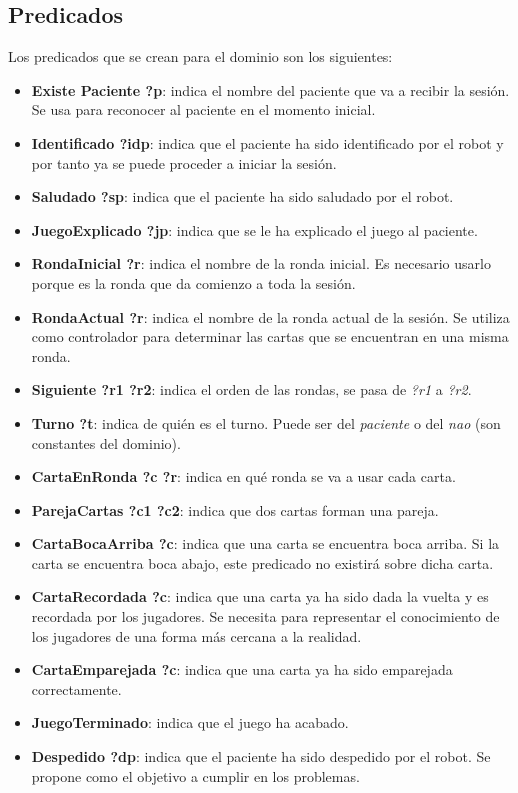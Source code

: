 \documentclass{uc3mpracticas}
\begin{document}
  \subsection{Predicados}

  Los predicados que se crean para el dominio son los siguientes:

  \begin{itemize}
    \item \textbf{Existe Paciente ?p}: indica el nombre del paciente que va a recibir la sesión. Se usa para reconocer al paciente en el momento inicial.
    \item \textbf{Identificado ?idp}: indica que el paciente ha sido identificado por el robot y por tanto ya se puede proceder a iniciar la sesión.
    \item \textbf{Saludado ?sp}: indica que el paciente ha sido saludado por el robot.
    \item \textbf{JuegoExplicado ?jp}: indica que se le ha explicado el juego al paciente.
    \item \textbf{RondaInicial ?r}: indica el nombre de la ronda inicial. Es necesario usarlo porque es la ronda que da comienzo a toda la sesión.
    \item \textbf{RondaActual ?r}: indica el nombre de la ronda actual de la sesión. Se utiliza como controlador para determinar las cartas que se encuentran en una misma ronda.
    \item \textbf{Siguiente ?r1 ?r2}: indica el orden de las rondas, se pasa de \textit{?r1} a \textit{?r2}.
    \item \textbf{Turno ?t}: indica de quién es el turno. Puede ser del \textit{paciente} o del \textit{nao} (son constantes del dominio).
    \item \textbf{CartaEnRonda ?c ?r}: indica en qué ronda se va a usar cada carta.
    \item \textbf{ParejaCartas ?c1 ?c2}: indica que dos cartas forman una pareja.
    \item \textbf{CartaBocaArriba ?c}: indica que una  carta se encuentra boca arriba. Si la carta se encuentra boca abajo, este predicado no existirá sobre dicha carta.
    \item \textbf{CartaRecordada ?c}: indica que una carta ya ha sido dada la vuelta y es recordada por los jugadores. Se necesita para representar el conocimiento de los jugadores de una forma más cercana a la realidad.
    \item \textbf{CartaEmparejada ?c}: indica que una carta ya ha sido emparejada correctamente.
    \item \textbf{JuegoTerminado}: indica que el juego ha acabado.
    \item \textbf{Despedido ?dp}: indica que el paciente ha sido despedido por el robot. Se propone como el objetivo a cumplir en los problemas.
  \end{itemize}
\end{document}
